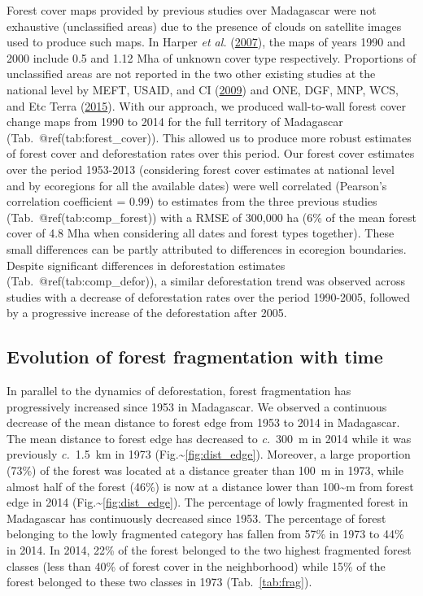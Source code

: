 \documentclass[]{article}
\theoremstyle{definition}
\theoremstyle{definition}
\theoremstyle{definition}
\theoremstyle{remark}
\begin{document}
Forest cover maps provided by previous studies over Madagascar were not
exhaustive (unclassified areas) due to the presence of clouds on
satellite images used to produce such maps. In Harper \emph{et al.}
(\protect\hyperlink{ref-Harper2007}{2007}), the maps of years 1990 and
2000 include 0.5 and 1.12 Mha of unknown cover type respectively.
Proportions of unclassified areas are not reported in the two other
existing studies at the national level by MEFT, USAID, and CI
(\protect\hyperlink{ref-MEFT2009}{2009}) and ONE, DGF, MNP, WCS, and Etc
Terra (\protect\hyperlink{ref-ONE2015}{2015}). With our approach, we
produced wall-to-wall forest cover change maps from 1990 to 2014 for the
full territory of Madagascar (Tab.~@ref(tab:forest\_cover)). This
allowed us to produce more robust estimates of forest cover and
deforestation rates over this period. Our forest cover estimates over
the period 1953-2013 (considering forest cover estimates at national
level and by ecoregions for all the available dates) were well
correlated (Pearson's correlation coefficient = 0.99) to estimates from
the three previous studies (Tab.~@ref(tab:comp\_forest)) with a RMSE of
300,000 ha (6\% of the mean forest cover of 4.8 Mha when considering all
dates and forest types together). These small differences can be partly
attributed to differences in ecoregion boundaries. Despite significant
differences in deforestation estimates (Tab.~@ref(tab:comp\_defor)), a
similar deforestation trend was observed across studies with a decrease
of deforestation rates over the period 1990-2005, followed by a
progressive increase of the deforestation after 2005.

\hypertarget{evolution-of-forest-fragmentation-with-time}{%
\subsection{Evolution of forest fragmentation with
time}\label{evolution-of-forest-fragmentation-with-time}}

In parallel to the dynamics of deforestation, forest fragmentation has
progressively increased since 1953 in Madagascar. We observed a
continuous decrease of the mean distance to forest edge from 1953 to
2014 in Madagascar. The mean distance to forest edge has decreased to
\emph{c.}~300~m in 2014 while it was previously \emph{c.}~1.5~km in 1973
(Fig.\textasciitilde{}\ref{fig:dist_edge}). Moreover, a large proportion
(73\%) of the forest was located at a distance greater than 100~m in
1973, while almost half of the forest (46\%) is now at a distance lower
than 100\textasciitilde{}m from forest edge in 2014
(Fig.\textasciitilde{}\ref{fig:dist_edge}). The percentage of lowly
fragmented forest in Madagascar has continuously decreased since 1953.
The percentage of forest belonging to the lowly fragmented category has
fallen from 57\% in 1973 to 44\% in 2014. In 2014, 22\% of the forest
belonged to the two highest fragmented forest classes (less than 40\% of
forest cover in the neighborhood) while 15\% of the forest belonged to
these two classes in 1973 (Tab.~\ref{tab:frag}).
\end{document}
